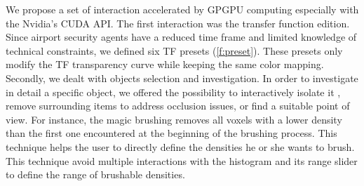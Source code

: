 We propose a set of interaction accelerated by GPGPU computing especially with the Nvidia's CUDA API. The first interaction was the transfer function edition. Since airport security agents have a reduced time frame and limited knowledge of technical constraints, we defined six TF presets (\autoref{f:preset}). These presets only modify the TF transparency curve while keeping the same color mapping. Secondly, we dealt with objects selection and investigation. In order to investigate in detail a specific object, we offered the possibility to interactively isolate it , remove surrounding items to address occlusion issues, or find a suitable point of view. For instance,
the magic brushing removes all voxels with a lower density than the first one encountered at the beginning of the brushing process. This technique helps the user to directly define the densities he or she wants to brush. This technique avoid multiple interactions with the histogram and its range slider to define the range of brushable densities.


